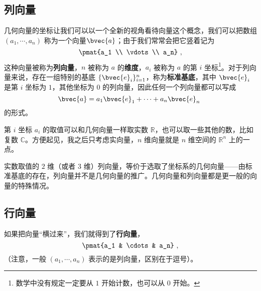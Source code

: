 
\begin{issues}
\issueDraft
\issueMissDepend
\end{issues}

\subsection{列向量}

几何向量的坐标让我们可以以一个全新的视角看待向量这个概念，我们可以把数组 $(a_1, \cdots, a_n)$ 称为一个向量$\bvec{a}$；由于我们常常会把它竖着记为
\begin{equation}
\pmat{a_1 \\ \vdots \\ a_n}~,
\end{equation}
这种向量被称为\textbf{列向量}，$n$ 被称为 $a$ 的\textbf{维度}，$a_i$ 被称为 $a$ 的第 $i$ 坐标\footnote{数学中没有规定一定要从 $1$ 开始计数，也可以从 $0$ 开始。}。对于列向量来说，存在一组特别的基底 $\{\bvec{e}_i\}_{i = 1}^n$，称为\textbf{标准基底}，其中 $\bvec{e}_i$ 是第 $i$ 坐标为 $1$，其他坐标为 $0$ 的列向量，因此任何一个列向量都可以写成
\begin{equation}
\bvec{a} = a_1 \bvec{e}_1 + \cdots + a_n \bvec{e}_n~
\end{equation}
的形式。

第 $i$ 坐标 $a_i$ 的取值可以和几何向量一样取实数 $\mathbb{R}$，也可以取一些其他的数，比如复数 $\mathbb{C}$。方便起见，我之后只考虑实向量，$n$ 维向量就是 $n$ 维空间的 $\mathbb{R}^n$ 上的一点。




实数取值的 $2$ 维（或者 $3$ 维）列向量，等价于选取了坐标系的几何向量——由标准基底的存在，列向量并不是几何向量的推广。几何向量和列向量都是更一般的向量的特殊情况。

\subsection{行向量}

如果把向量“横过来”，我们就得到了\textbf{行向量}，
\begin{equation}
\pmat{a_1 & \cdots & a_n}~,
\end{equation}
（注意，一般 $(a_1, \cdots, a_n)$ 表示的是列向量，区别在于逗号）。

